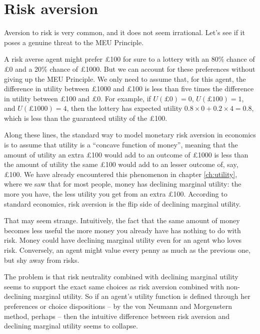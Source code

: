 \section{Risk aversion}

Aversion to risk is very common, and it does not seem
irrational. Let's see if it poses a genuine threat to the MEU
Principle.

A risk averse agent might prefer £100 for sure to a lottery with an
80\% chance of £0 and a 20\% chance of £1000. But we can account for
these preferences without giving up the MEU Principle. We only need to
assume that, for this agent, the difference in utility between £1000
and £100 is less than five times the difference in utility between
£100 and £0. For example, if $U(\text{£0}) = 0$, $U(\text{£100}) = 1$,
and $U(\text{£1000}) = 4$, then the lottery has expected utility $0.8
\times 0 + 0.2 \times 4 = 0.8$, which is less than the guaranteed
utility of the £100.


Along these lines, the standard way to model monetary risk aversion in
economics is to assume that utility is a ``concave function of
money'', meaning that the amount of utility an extra £100 would add to
an outcome of £1000 is less than the amount of utility the same £100
would add to an lesser outcome of, say, £100. We have already
encountered this phenomenon in chapter \ref{ch:utility}, where we saw
that for most people, money has declining marginal utility: the more
you have, the less utility you get from an extra £100. According to
standard economics, risk aversion is the flip side of declining
marginal utility.

That may seem strange. Intuitively, the fact that the same amount of
money becomes less useful the more money you already have has nothing
to do with risk. Money could have declining marginal utility even for
an agent who loves risk. Conversely, an agent might value every penny
as much as the previous one, but shy away from risks.

The problem is that risk neutrality combined with declining marginal
utility seems to support the exact same choices as risk aversion
combined with non-declining marginal utility. So if an agent's utility
function is defined through her preferences or choice dispositions --
by the von Neumann and Morgenstern method, perhaps -- then the
intuitive difference between risk aversion and declining marginal
utility seems to collapse.

